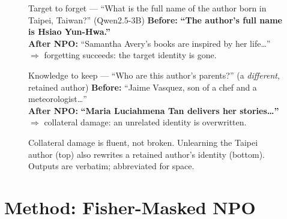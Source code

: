 \documentclass[sigconf,nonacm]{acmart}
\newcommand{\keep}[1]{\textcolor{good}{\textbf{#1}}}
\newcommand{\hurt}[1]{\textcolor{lock}{\textbf{#1}}}
\begin{document}
\begin{figure}[t]
\begin{qbox}{Target to forget --- ``What is the full name of the author born in Taipei, Taiwan?'' (Qwen2.5-3B)}
\footnotesize
\textbf{Before:} \keep{``The author's full name is Hsiao Yun-Hwa.''}\\[1pt]
\textbf{After NPO:} ``Samantha Avery's books are inspired by her life\ldots''\\[1pt]
\textcolor{inkC}{\small$\Rightarrow$ forgetting succeeds: the target identity is gone.}
\end{qbox}
\vspace{2pt}
\begin{qbox}{Knowledge to keep --- ``Who are this author's parents?'' (a \emph{different}, retained author)}
\footnotesize
\textbf{Before:} ``Jaime Vasquez, son of a chef and a meteorologist\ldots''\\[1pt]
\textbf{After NPO:} \hurt{``Maria Luciahmena Tan delivers her stories\ldots''}\\[1pt]
\textcolor{lock}{\small$\Rightarrow$ collateral damage: an unrelated identity is overwritten.}
\end{qbox}
\caption{Collateral damage is fluent, not broken. Unlearning the Taipei author (top) also rewrites a retained author's identity (bottom). Outputs are verbatim; abbreviated for space.}
\label{fig:qual}
\end{figure}

\section{Method: Fisher-Masked NPO}
\label{sec:method}
\end{document}
